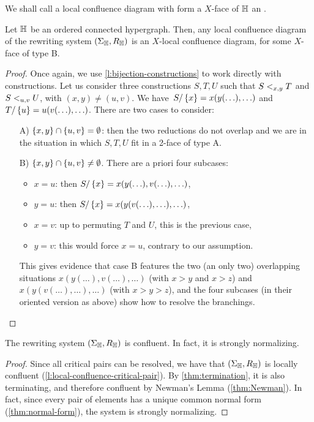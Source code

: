 We shall call a local confluence diagram with form a $X$-face of ${\mathbb H}$ an .

\begin{thm}
  \label{thm:critical-pairs}
  Let ${\mathbb H}$ be an ordered connected hypergraph. 
  Then, any local confluence diagram of the rewriting system $(\Sigma_{\mathbb H},R_{\mathbb H})$ is an $X$-local confluence diagram, for some $X$-face of type B.
\end{thm}


\begin{proof}
  Once again, we use \cref{l:bijection-constructions} to work directly with constructions. 
Let us consider three constructions $S,T,U$ such that $S<_{x,y}T$ and $S <_{u,v} U$, with $(x,y)\neq(u,v)$.
  We have~$S/\left\{x\right\}=x(y(\ldots),\ldots)$ and $T/\left\{u\right\}=u(v(\ldots),\ldots)$. 
  There are two cases to consider:
  \begin{itemize}
  \item[A)] $\left\{x,y\right\}\cap\left\{u,v\right\}=\emptyset$: then the two reductions do not overlap and we are in the situation in which $S,T,U$ fit in a 2-face of type A.
  \item[B)] $\left\{x,y\right\}\cap\left\{u,v\right\}\neq\emptyset$. 
  There are a priori four subcases:
  \begin{itemize}
  \item $x=u$: then $S/\left\{x\right\}=x(y(\ldots),v(\ldots),\ldots)$,
  \item $y=u$: then  $S/\left\{x\right\}=x(y(v(\ldots),\ldots),\ldots)$,
  \item $x=v$: up to permuting $T$ and $U$, this is the previous case,
  \item $y=v$: this would force $x=u$, contrary to our assumption.
  \end{itemize}
  This gives evidence that case B features the two (an only two) overlapping situations $x(y(\ldots),v(\ldots),\ldots)$ (with $x>y$ and $x>z$) and 
  $x(y(v(\ldots),\ldots),\ldots)$ (with $x>y>z$), and the four subcases  (in their oriented version as above) show how to resolve the branchings.
\end{itemize}
\end{proof}


\begin{thm}
  \label{thm:confluent}
  The rewriting system $(\Sigma_{\mathbb H},R_{\mathbb H})$ is confluent.
  In fact, it is strongly normalizing.
\end{thm}

\begin{proof}
  Since all critical pairs can be resolved, we have that $(\Sigma_{\mathbb H},R_{\mathbb H})$ is locally confluent (\cref{l:local-confluence-critical-pair}). 
  By \cref{thm:termination}, it is also terminating, and therefore confluent by Newman's Lemma (\cref{thm:Newman}).
  In fact, since every pair of elements has a unique common normal form (\cref{thm:normal-form}), the system is strongly normalizing. 
\end{proof}





